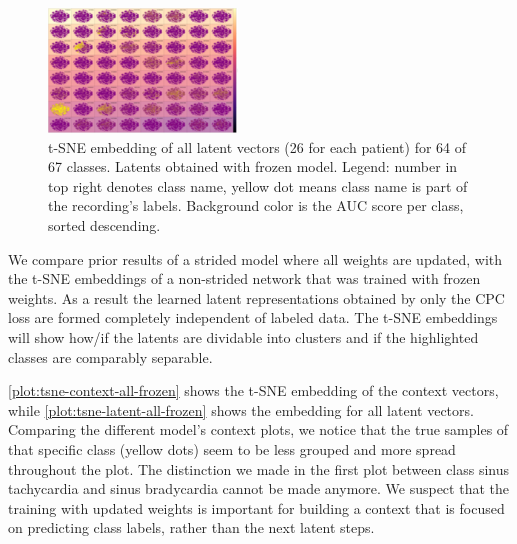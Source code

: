 \begin{figure}[H]\centering
	\includegraphics[height=\linewidth, angle=90]{bilder/tsne-latent-all2(ordered by auc).png}
	\caption[Two dimensional t-SNE embeddings of all latent vectors (different model)]{t-SNE embedding of all latent vectors (26 for each patient) for 64 of 67 classes. Latents obtained with frozen model. Legend: number in top right denotes class name, yellow dot means class name is part of the recording's labels. Background color is the AUC score per class, sorted descending.}
	\label{plot:tsne-latent-all-frozen}
\end{figure}

We compare prior results of a strided model where all weights are updated, with the t-SNE embeddings of a non-strided network that was trained with frozen weights. As a result the learned latent representations obtained by only the CPC loss are formed completely independent of labeled data. The t-SNE embeddings will show how/if the latents are dividable into clusters and if the highlighted classes are comparably separable. 

\autoref{plot:tsne-context-all-frozen} shows the t-SNE embedding of the context vectors, while \autoref{plot:tsne-latent-all-frozen} shows the embedding for all latent vectors. Comparing the different model's context plots, we notice that the true samples of that specific class (yellow dots) seem to be less grouped and more spread throughout the plot. The distinction we made in the first plot between class sinus tachycardia and sinus bradycardia cannot be made anymore. We suspect that the training with updated weights is important for building a context that is focused on predicting class labels, rather than the next latent steps.


